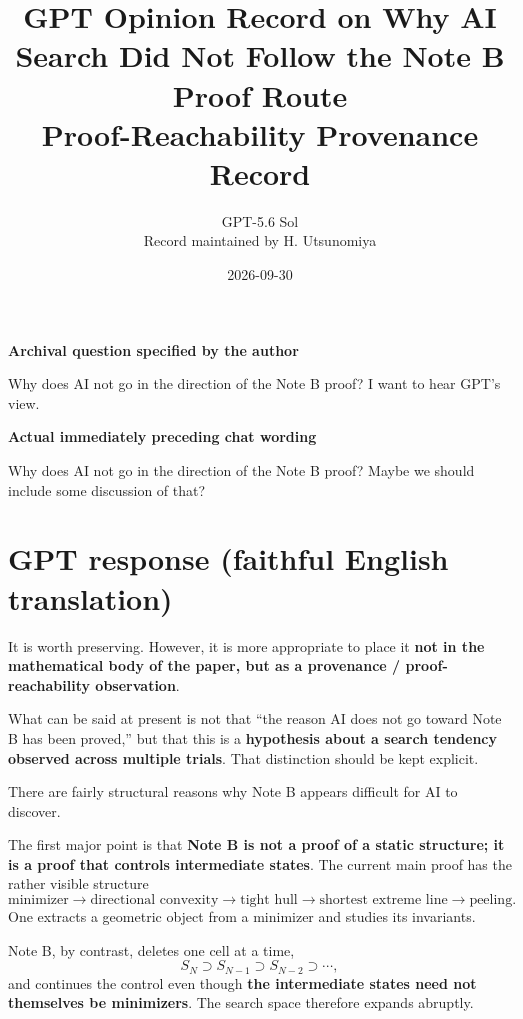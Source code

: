 \documentclass[11pt,a4paper]{article}
\title{\bfseries GPT Opinion Record on Why AI Search Did Not Follow the Note B Proof Route\\[4pt]
\large Proof-Reachability Provenance Record}
\author{GPT-5.6 Sol\\Record maintained by H. Utsunomiya}
\date{2026-09-30}
\newcommand{\recordlabel}[1]{\par\noindent\textsf{\bfseries #1}\par}
\begin{document}
\maketitle

\begin{center}
\end{center}

\recordlabel{Archival question specified by the author}
Why does AI not go in the direction of the Note B proof? I want to hear GPT's view.

\recordlabel{Actual immediately preceding chat wording}
Why does AI not go in the direction of the Note B proof? Maybe we should include some discussion of that?

\section*{GPT response (faithful English translation)}

It is worth preserving. However, it is more appropriate to place it \textbf{not in the mathematical body of the paper, but as a provenance / proof-reachability observation}.

What can be said at present is not that ``the reason AI does not go toward Note B has been proved,'' but that this is a \textbf{hypothesis about a search tendency observed across multiple trials}. That distinction should be kept explicit.

There are fairly structural reasons why Note B appears difficult for AI to discover.

The first major point is that \textbf{Note B is not a proof of a static structure; it is a proof that controls intermediate states}. The current main proof has the rather visible structure
\[
\text{minimizer}
\to
\text{directional convexity}
\to
\text{tight hull}
\to
\text{shortest extreme line}
\to
\text{peeling}.
\]
One extracts a geometric object from a minimizer and studies its invariants.

Note B, by contrast, deletes one cell at a time,
\[
S_N\supset S_{N-1}\supset S_{N-2}\supset\cdots,
\]
and continues the control even though \textbf{the intermediate states need not themselves be minimizers}. The search space therefore expands abruptly.
\end{document}
